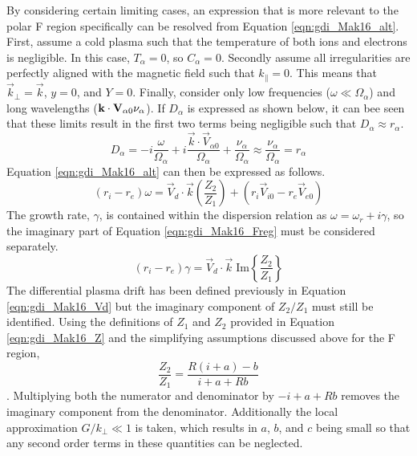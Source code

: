 By considering certain limiting cases, an expression that is more relevant to the polar F region specifically can be resolved from Equation \ref{eqn:gdi_Mak16_alt}.  First, assume a cold plasma such that the temperature of both ions and electrons is negligible.  In this case, \(T_\alpha = 0\), so \(C_\alpha = 0\).  Secondly assume all irregularities are perfectly aligned with the magnetic field such that \(k_\parallel = 0\).  This means that \(\vec{k}_\perp = \vec{k}\), \(y=0\), and \(Y=0\).  Finally, consider only low frequencies (\(\omega \ll \Omega_\alpha\)) and long wavelengths (\(\vec{k}\cdot\vec{V}_{\alpha 0} \\ \nu_\alpha\)).  If \(D_\alpha\) is expressed as shown below, it can bee seen that these limits result in the first two terms being negligible such that \(D_\alpha \approx r_\alpha\).
\begin{equation}
	D_\alpha = -i\frac{\omega}{\Omega_\alpha} + i\frac{\vec{k}\cdot\vec{V}_{\alpha 0}}{\Omega_\alpha} + \frac{\nu_\alpha}{\Omega_\alpha} \approx \frac{\nu_\alpha}{\Omega_\alpha} = r_\alpha
\end{equation}
Equation \ref{eqn:gdi_Mak16_alt} can then be expressed as follows.
\begin{equation}
	\label{eqn:gdi_Mak16_Freg}
	(r_i-r_e)\omega = \vec{V}_d\cdot\vec{k}\left(\frac{Z_2}{Z_1}\right)+(r_i\vec{V}_{i0}-r_e\vec{V}_{e0})
\end{equation}
The growth rate, \(\gamma\), is contained within the dispersion relation as \(\omega = \omega_r+i\gamma\), so the imaginary part of Equation \ref{eqn:gdi_Mak16_Freg} must be considered separately.
\begin{equation}
	\label{eqn:gdi_Mak16_gam}
	(r_i-r_e)\gamma = \vec{V}_d\cdot\vec{k}\;\text{Im}\left\{\frac{Z_2}{Z_1}\right\}
\end{equation}
The differential plasma drift has been defined previously in Equation \ref{eqn:gdi_Mak16_Vd} but the imaginary component of \(Z_2/Z_1\) must still be identified.  Using the definitions of \(Z_1\) and \(Z_2\) provided in Equation \ref{eqn:gdi_Mak16_Z} and the simplifying assumptions discussed above for the F region,
\begin{equation}
	\frac{Z_2}{Z_1} = \frac{R(i+a)-b}{i+a+Rb}
\end{equation}.
Multiplying both the numerator and denominator by \(-i+a+Rb\) removes the imaginary component from the denominator.  Additionally the local approximation \(G/k_\perp \ll 1\) is taken, which results in \(a\), \(b\), and \(c\) being small so that any second order terms in these quantities can be neglected.
